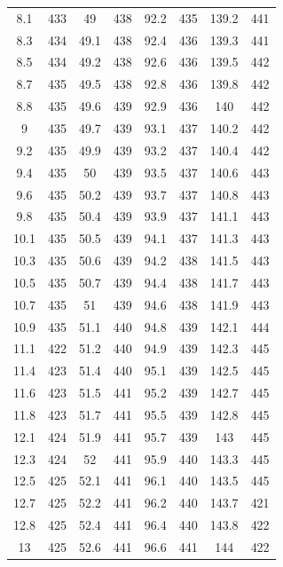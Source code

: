 \documentclass[12pt]{ctexart}
\numberwithin{equation}{section}
\begin{document}
\begin{longtable}{cc|cc|cc|cc}
8.1  &  433  &  49  &  438  &  92.2  &  435  &  139.2  &  441  \\
8.3  &  434  &  49.1  &  438  &  92.4  &  436  &  139.3  &  441  \\
8.5  &  434  &  49.2  &  438  &  92.6  &  436  &  139.5  &  442  \\
8.7  &  435  &  49.5  &  438  &  92.8  &  436  &  139.8  &  442  \\
8.8  &  435  &  49.6  &  439  &  92.9  &  436  &  140  &  442  \\
9  &  435  &  49.7  &  439  &  93.1  &  437  &  140.2  &  442  \\
9.2  &  435  &  49.9  &  439  &  93.2  &  437  &  140.4  &  442  \\
9.4  &  435  &  50  &  439  &  93.5  &  437  &  140.6  &  443  \\
9.6  &  435  &  50.2  &  439  &  93.7  &  437  &  140.8  &  443  \\
9.8  &  435  &  50.4  &  439  &  93.9  &  437  &  141.1  &  443  \\
10.1  &  435  &  50.5  &  439  &  94.1  &  437  &  141.3  &  443  \\
10.3  &  435  &  50.6  &  439  &  94.2  &  438  &  141.5  &  443  \\
10.5  &  435  &  50.7  &  439  &  94.4  &  438  &  141.7  &  443  \\
10.7  &  435  &  51  &  439  &  94.6  &  438  &  141.9  &  443  \\
10.9  &  435  &  51.1  &  440  &  94.8  &  439  &  142.1  &  444  \\
11.1  &  422  &  51.2  &  440  &  94.9  &  439  &  142.3  &  445  \\
11.4  &  423  &  51.4  &  440  &  95.1  &  439  &  142.5  &  445  \\
11.6  &  423  &  51.5  &  441  &  95.2  &  439  &  142.7  &  445  \\
11.8  &  423  &  51.7  &  441  &  95.5  &  439  &  142.8  &  445  \\
12.1  &  424  &  51.9  &  441  &  95.7  &  439  &  143  &  445  \\
12.3  &  424  &  52  &  441  &  95.9  &  440  &  143.3  &  445  \\
12.5  &  425  &  52.1  &  441  &  96.1  &  440  &  143.5  &  445  \\
12.7  &  425  &  52.2  &  441  &  96.2  &  440  &  143.7  &  421  \\
12.8  &  425  &  52.4  &  441  &  96.4  &  440  &  143.8  &  422  \\
13  &  425  &  52.6  &  441  &  96.6  &  441  &  144  &  422  \\

\end{longtable}
\end{document}

